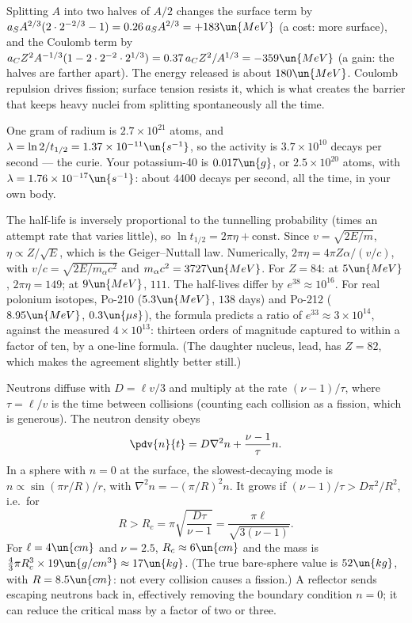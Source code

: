  Splitting $A$ into two halves of $A/2$ changes the surface term by $a_SA^{2/3}(2\cdot2^{-2/3} - 1) = 0.26\,a_SA^{2/3} = +183\un{MeV}$ (a cost: more surface), and the Coulomb term by $a_CZ^2A^{-1/3}(1 - 2\cdot2^{-2}\cdot2^{1/3}) = 0.37\,a_CZ^2/A^{1/3} = -359\un{MeV}$ (a gain: the halves are farther apart). The energy released is about $180\un{MeV}$. Coulomb repulsion drives fission; surface tension resists it, which is what creates the barrier that keeps heavy nuclei from splitting spontaneously all the time.

 One gram of radium is $2.7\times10^{21}$ atoms, and $\lambda = \ln2/t_{1/2} = 1.37\times10^{-11}\un{s^{-1}}$, so the activity is $3.7\times10^{10}$ decays per second --- the curie. Your potassium-40 is $0.017\un{g}$, or $2.5\times10^{20}$ atoms, with $\lambda = 1.76\times10^{-17}\un{s^{-1}}$: about $4400$ decays per second, all the time, in your own body.

 The half-life is inversely proportional to the tunnelling probability (times an attempt rate that varies little), so $\ln t_{1/2} = 2\pi\eta + \text{const}$. Since $v = \sqrt{2E/m}$, $\eta\propto Z/\sqrt E$, which is the Geiger--Nuttall law. Numerically, $2\pi\eta = 4\pi Z\alpha/(v/c)$, with $v/c = \sqrt{2E/m_\alpha c^2}$ and $m_\alpha c^2 = 3727\un{MeV}$. For $Z = 84$: at $5\un{MeV}$, $2\pi\eta = 149$; at $9\un{MeV}$, $111$. The half-lives differ by $e^{38}\approx10^{16}$. For real polonium isotopes, Po-210 ($5.3\un{MeV}$, $138$ days) and Po-212 ($8.95\un{MeV}$, $0.3\un{\mu s}$), the formula predicts a ratio of $e^{33}\approx3\times10^{14}$, against the measured $4\times10^{13}$: thirteen orders of magnitude captured to within a factor of ten, by a one-line formula. (The daughter nucleus, lead, has $Z = 82$, which makes the agreement slightly better still.)

 Neutrons diffuse with $D = \ell v/3$ and multiply at the rate $(\nu-1)/\tau$, where $\tau = \ell/v$ is the time between collisions (counting each collision as a fission, which is generous). The neutron density obeys
\[
  \pdv{n}{t} = D\nabla^2n + \frac{\nu-1}{\tau}n.
\]
In a sphere with $n = 0$ at the surface, the slowest-decaying mode is $n\propto\sin(\pi r/R)/r$, with $\nabla^2n = -(\pi/R)^2n$. It grows if $(\nu-1)/\tau>D\pi^2/R^2$, i.e.\ for
\[
  R>R_c = \pi\sqrt{\frac{D\tau}{\nu-1}} = \frac{\pi\ell}{\sqrt{3(\nu-1)}}.
\]
For $\ell = 4\un{cm}$ and $\nu = 2.5$, $R_c\approx6\un{cm}$ and the mass is $\tfrac43\pi R_c^3\times19\un{g/cm^3}\approx17\un{kg}$. (The true bare-sphere value is $52\un{kg}$, with $R = 8.5\un{cm}$: not every collision causes a fission.) A reflector sends escaping neutrons back in, effectively removing the boundary condition $n = 0$; it can reduce the critical mass by a factor of two or three.

